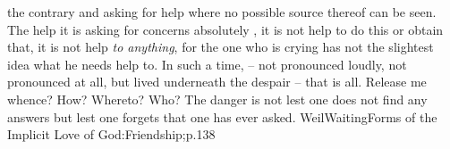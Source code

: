 the contrary and asking for help where no possible source thereof can be seen.
The help it is asking for concerns absolutely , it is not help to do
this or obtain that, it is not help {\em to anything}, for the one who is crying
has not the slightest idea what he needs help to. In such a time, 
 -- not pronounced loudly, not pronounced at all, but lived
underneath the despair -- that is all.  Release me whence? How? Whereto?
Who? %
The danger is not lest one does not find any answers but lest one forgets that
one has ever asked.  \citet{The danger is not lest the soul should doubt whether
  there is any bread, but lest, by a lie, it should persuade itself that it is
  not hungry.}{WeilWaiting}{Forms of the Implicit Love of God:Friendship;p.138}

